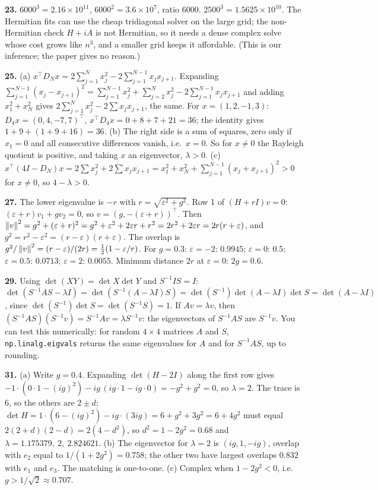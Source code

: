 \textbf{23.} $6000^3=2.16\times10^{11}$, $6000^2=3.6\times10^7$, ratio $6000$. $2500^3=1.5625\times10^{10}$. The Hermitian fits can use the cheap tridiagonal solver on the large grid; the non-Hermitian check $H+iA$ is not Hermitian, so it needs a dense complex solve whose cost grows like $n^3$, and a smaller grid keeps it affordable. (This is our inference; the paper gives no reason.)

\textbf{25.} (a) $x^\top D_Nx=2\sum_{j=1}^Nx_j^2-2\sum_{j=1}^{N-1}x_jx_{j+1}$. Expanding $\sum_{j=1}^{N-1}(x_j-x_{j+1})^2=\sum_{j=1}^{N-1}x_j^2+\sum_{j=2}^{N}x_j^2-2\sum_{j=1}^{N-1}x_jx_{j+1}$ and adding $x_1^2+x_N^2$ gives $2\sum_{j=1}^Nx_j^2-2\sum x_jx_{j+1}$, the same. For $x=(1,2,-1,3)$: $D_4x=(0,4,-7,7)^\top$, $x^\top D_4x=0+8+7+21=36$; the identity gives $1+9+(1+9+16)=36$. (b) The right side is a sum of squares, zero only if $x_1=0$ and all consecutive differences vanish, i.e.\ $x=0$. So for $x\ne0$ the Rayleigh quotient is positive, and taking $x$ an eigenvector, $\lambda>0$. (c) $x^\top(4I-D_N)x=2\sum x_j^2+2\sum x_jx_{j+1}=x_1^2+x_N^2+\sum_{j=1}^{N-1}(x_j+x_{j+1})^2>0$ for $x\ne0$, so $4-\lambda>0$.

\textbf{27.} The lower eigenvalue is $-r$ with $r=\sqrt{\varepsilon^2+g^2}$. Row 1 of $(H+rI)v=0$: $(\varepsilon+r)v_1+gv_2=0$, so $v=(g,-(\varepsilon+r))^\top$. Then $\left\lVert v\right\rVert^2=g^2+(\varepsilon+r)^2=g^2+\varepsilon^2+2\varepsilon r+r^2=2r^2+2\varepsilon r=2r(r+\varepsilon)$, and $g^2=r^2-\varepsilon^2=(r-\varepsilon)(r+\varepsilon)$. The overlap is $g^2/\left\lVert v\right\rVert^2=(r-\varepsilon)/(2r)=\tfrac12(1-\varepsilon/r)$. For $g=0.3$: $\varepsilon=-2$: $0.9945$; $\varepsilon=0$: $0.5$; $\varepsilon=0.5$: $0.0713$; $\varepsilon=2$: $0.0055$. Minimum distance $2r$ at $\varepsilon=0$: $2g=0.6$.

\textbf{29.} Using $\det(XY)=\det X\det Y$ and $S^{-1}IS=I$: $\det(S^{-1}AS-\lambda I)=\det(S^{-1}(A-\lambda I)S)=\det(S^{-1})\det(A-\lambda I)\det S=\det(A-\lambda I)$, since $\det(S^{-1})\det S=\det(S^{-1}S)=1$. If $Av=\lambda v$, then $(S^{-1}AS)(S^{-1}v)=S^{-1}Av=\lambda S^{-1}v$: the eigenvectors of $S^{-1}AS$ are $S^{-1}v$. You can test this numerically: for random $4\times4$ matrices $A$ and $S$, \texttt{np.linalg.eigvals} returns the same eigenvalues for $A$ and for $S^{-1}AS$, up to rounding.

\textbf{31.} (a) Write $g=0.4$. Expanding $\det(H-2I)$ along the first row gives $-1\cdot(0\cdot1-(ig)^2)-ig\,(ig\cdot1-ig\cdot0)=-g^2+g^2=0$, so $\lambda=2$. The trace is $6$, so the others are $2\pm d$; $\det H=1\cdot(6-(ig)^2)-ig\cdot(3ig)=6+g^2+3g^2=6+4g^2$ must equal $2(2+d)(2-d)=2(4-d^2)$, so $d^2=1-2g^2=0.68$ and $\lambda=1.175379,\ 2,\ 2.824621$. (b) The eigenvector for $\lambda=2$ is $(ig,1,-ig)$, overlap with $e_2$ equal to $1/(1+2g^2)=0.758$; the other two have largest overlaps $0.832$ with $e_1$ and $e_3$. The matching is one-to-one. (c) Complex when $1-2g^2<0$, i.e.\ $g>1/\sqrt2\approx0.707$.

